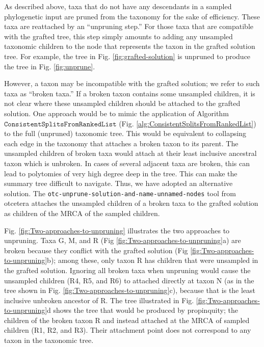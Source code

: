 \documentclass[fleqn,12pt,lineno,english]{wlpeerj}
\begin{document}
As described above, taxa that do not have any descendants in a sampled
phylogenetic input are pruned from the taxonomy for the sake of efficiency.
These taxa are reattached by an ``unpruning step.'' For those taxa
that are compatible with the grafted tree, this step simply amounts
to adding any unsampled taxonomic children to the node that represents
the taxon in the grafted solution tree.  For example, the tree in
Fig. \ref{fig:grafted-solution} is unpruned to produce the tree in
Fig. \ref{fig:unprune}.

However, a taxon may be incompatible with the grafted solution; we
refer to such taxa as ``broken taxa.'' If a broken taxon contains
some unsampled children, it is not clear where these unsampled children
should be attached to the grafted solution. One approach would be
to mimic the application of Algorithm $\texttt{ConsistentSplitsFromRankedList}$ (Fig. \ref{alg:ConsistentSplitsFromRankedList})
to the full (unpruned) taxonomic tree. This would be equivalent to
collapsing each edge in the taxonomy that attaches a broken taxon
to its parent. The unsampled children of broken taxa would attach
at their least inclusive ancestral taxon which is unbroken. In cases
of several adjacent taxa are broken, this can lead to polytomies of
very high degree deep in the tree. This can make the summary tree
difficult to navigate. Thus, we have adopted an alternative solution.
The \texttt{otc-unprune-solution-and-name-unnamed-nodes} tool from
otcetera attaches the unsampled children of a broken taxa to the grafted
solution as children of the MRCA of the sampled children.

Fig. \ref{fig:Two-approaches-to-unpruning} illustrates the two
approaches to unpruning. Taxa G, M, and R (Fig \ref{fig:Two-approaches-to-unpruning}a)
are broken because they conflict with the grafted solution (Fig \ref{fig:Two-approaches-to-unpruning}b);
among these, only taxon R has children that were unsampled in the
grafted solution. Ignoring all broken taxa when unpruning would cause
the unsampled children (R4, R5, and R6) to attached directly at taxon
N (as in the tree shown in Fig. \ref{fig:Two-approaches-to-unpruning}c),
because that is the least inclusive unbroken ancestor of R. The tree
illustrated in Fig. \ref{fig:Two-approaches-to-unpruning}d shows the
tree that would be produced by propinquity; the children of the broken
taxon R and instead attached at the MRCA of sampled children (R1,
R2, and R3). Their attachment point does not correspond to any taxon
in the taxonomic tree.
\end{document}
